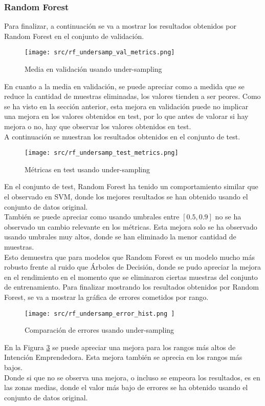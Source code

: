 \subsubsection*{Random Forest}
Para finalizar, a continuación se va a mostrar los resultados obtenidos por Random Forest en el conjunto de validación.
\begin{figure}[H]
	\centering
	\texttt{[image: src/rf\_undersamp\_val\_metrics.png]}
	\caption{Media en validación usando under-sampling}
	\label{fig:cmp_val_rf}
\end{figure}
En cuanto a la media en validación, se puede apreciar como a medida que se reduce la cantidad de muestras eliminadas, los valores tienden a ser peores. Como se ha visto en la sección anterior, esta mejora en validación puede no implicar una mejora en los valores obtenidos en test, por lo que antes de valorar si hay mejora o no, hay que observar los valores obtenidos en test.\\
\clearpage
A continuación se muestran los resultados obtenidos en el conjunto de test.
\begin{figure}[H]
	\centering
	\texttt{[image: src/rf\_undersamp\_test\_metrics.png]}
	\caption{Métricas en test usando under-sampling}
	\label{fig:cmp_test_rf}
\end{figure}
En el conjunto de test, Random Forest ha tenido un comportamiento similar que el observado en SVM, donde los mejores resultados se han obtenido usando el conjunto de datos original.\\
\linebreak
También se puede apreciar como usando umbrales entre $\left[0.5,0.9\right]$ no se ha observado un cambio relevante en los métricas. Esta mejora solo se ha observado usando umbrales muy altos, donde se han eliminado la menor cantidad de muestras.\\
\linebreak
Esto demuestra que para modelos que Random Forest es un modelo mucho más robusto frente al ruido que Árboles de Decisión, donde se pudo apreciar la mejora en el rendimiento en el momento que se eliminaron ciertas muestras del conjunto de entrenamiento.
\clearpage
Para finalizar mostrando los resultados obtenidos por Random Forest, se va a mostrar la gráfica de errores cometidos por rango.
\begin{figure}[H]
	\centering
	\texttt{[image: src/rf\_undersamp\_error\_hist.png ]}
	\caption{Comparación de errores usando under-sampling}
	\label{fig:cmp_error_rf}
\end{figure}
En la Figura \ref{fig:cmp_error_rf} se puede apreciar una mejora para los rangos más altos de Intención Emprendedora. Esta mejora también se aprecia en los rangos más bajos. \\
Donde si que no se observa una mejora, o incluso se empeora los resultados, es en las zonas medias, donde el valor más bajo de errores se ha obtenido usando el conjunto de datos original.
\clearpage
